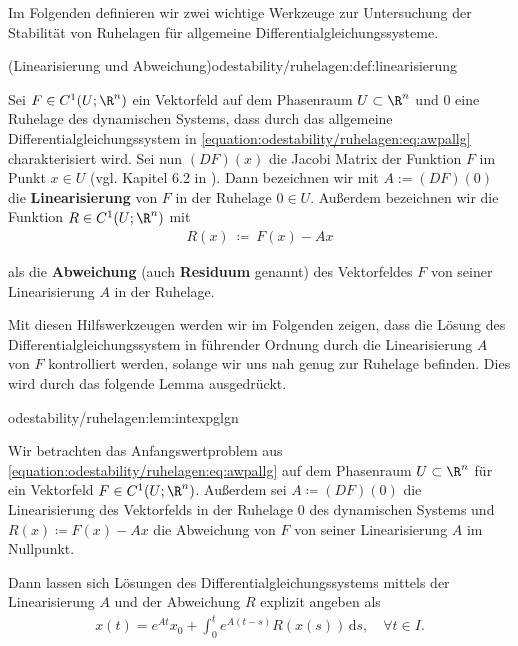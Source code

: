 \documentclass[letterpaper,10pt,english]{jupyterBook}
\begin{document}
\par
Im Folgenden definieren wir zwei wichtige Werkzeuge zur Untersuchung der Stabilität von Ruhelagen für allgemeine Differentialgleichungssysteme.
\begin{definition}{(Linearisierung und Abweichung)}{odestability/ruhelagen:def:linearisierung}



\par
Sei \(F\in C^1(U;\R^n)\) ein Vektorfeld auf dem Phasenraum \(U \subset \R^n\) und \(0\) eine Ruhelage des dynamischen Systems, dass durch das allgemeine Differentialgleichungssystem in \eqref{equation:odestability/ruhelagen:eq:awpallg} charakterisiert wird.
Sei nun \((DF)(x)\) die Jacobi Matrix der Funktion \(F\) im Punkt \(x \in U\) (vgl. Kapitel 6.2 in \cite{Ten21}).
Dann bezeichnen wir mit \(A := (DF)(0)\) die \textbf{Linearisierung} von \(F\) in der Ruhelage \(0 \in U\).
Außerdem bezeichnen wir die Funktion \(R \in C^1(U; \R^n)\) mit
\begin{align*}
R(x) \ \coloneqq \ F(x) - Ax
\end{align*}
\par
als die \textbf{Abweichung} (auch \textbf{Residuum} genannt) des Vektorfeldes \(F\) von seiner Linearisierung \(A\) in der Ruhelage.
\end{definition}

\par
Mit diesen Hilfswerkzeugen werden wir im Folgenden zeigen, dass die Lösung des Differentialgleichungssystem in führender Ordnung durch die Linearisierung \(A\) von \(F\) kontrolliert werden, solange wir uns nah genug zur Ruhelage befinden. Dies wird durch das folgende Lemma ausgedrückt.
\begin{lemma}{}{odestability/ruhelagen:lem:intexpglgn}



\par
Wir betrachten das Anfangswertproblem aus \eqref{equation:odestability/ruhelagen:eq:awpallg} auf dem Phasenraum \(U \subset \R^n\) für ein Vektorfeld \(F\in C^1(U;\R^n)\).
Außerdem sei \(A \coloneqq (DF)(0)\) die Linearisierung des Vektorfelds in der Ruhelage \(0\) des dynamischen Systems und \(R(x) \coloneqq F(x) - Ax\) die Abweichung von \(F\) von seiner Linearisierung \(A\) im Nullpunkt.

\par
Dann lassen sich Lösungen des Differentialgleichungssystems mittels der Linearisierung \(A\) und der Abweichung \(R\) explizit angeben als
\begin{align*}
x(t) = e^{At}x_0 + \int_0^t e^{A(t-s)} R(x(s))\, \mathrm{d}s, \quad \forall t \in I.
\end{align*}\end{lemma}
\end{document}
